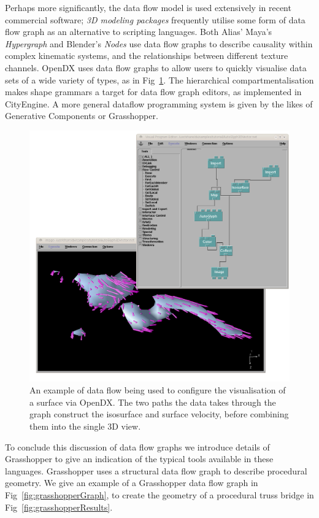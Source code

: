 Perhaps more significantly, the data flow model is used extensively in recent commercial software; \emph{3D modeling packages} frequently utilise some form of data flow graph as an alternative to scripting languages. Both Alias' Maya's \emph{Hypergraph} and Blender's \emph{Nodes} use data flow graphs to describe causality within complex kinematic systems, and the relationships between different texture channels. OpenDX\cite{Thompson01} uses data flow graphs to allow users to quickly visualise data sets of a wide variety of types, as in Fig~\ref{fig:opendx}. The hierarchical compartmentalisation makes shape grammars a target for data flow graph editors, as implemented in CityEngine\cite{cityEngine}.
A more general dataflow programming system is given by the likes of Generative Components\cite{bentley} or Grasshopper\cite{grasshopper}. 

\begin{figure}
\centering
\includegraphics[width = 0.8\columnwidth]{opendx.png}
\caption[The OpenDX visual programming language]{An example of data flow being used to configure the visualisation of a surface via OpenDX. The two paths the data takes through the graph construct the isosurface and surface velocity, before combining them into the single 3D view.}
\label{fig:opendx}
\end{figure}

To conclude this discussion of data flow graphs we introduce details of Grasshopper to give an indication of the typical tools available in these languages. Grasshopper uses a structural data flow graph to describe procedural geometry. We give an example of a Grasshopper data flow graph in Fig~\ref{fig:grasshopperGraph}, to create the geometry of a procedural truss bridge in Fig~\ref{fig:grasshopperResults}.

